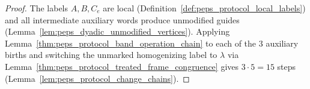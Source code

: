 \begin{proof}\leanok
    The labels $A,B,C_e$ are local (Definition~\ref{def:peps_protocol_local_labels}) and all intermediate auxiliary words produce unmodified guides (Lemma~\ref{lem:peps_dyadic_unmodified_vertices}). Applying Lemma~\ref{thm:peps_protocol_band_operation_chain} to each of the $3$ auxiliary births and switching the unmarked homogenizing label to $\lambda$ via Lemma~\ref{thm:peps_protocol_treated_frame_congruence} gives $3\cdot 5=15$ steps (Lemma~\ref{lem:peps_protocol_change_chains}).
\end{proof}

